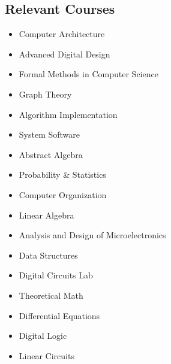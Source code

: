 \documentclass[18pt]{article}
\providecommand{\tightlist}{
    \setlength{\itemsep}{0pt}\setlength{\parskip}{0pt}
}
\begin{document}
\begin{multicols}{2}
    \subsection*{Relevant Courses}\label{relevant-courses}
      \begin{itemize}\tightlist
      \item Computer Architecture
      \item Advanced Digital Design
      \item Formal Methods in Computer Science
      \item Graph Theory
      \item Algorithm Implementation
      \item System Software
      \item Abstract Algebra
      \item Probability \& Statistics
      \item Computer Organization
      \item Linear Algebra
      \item Analysis and Design of Microelectronics
      \item Data Structures
      \item Digital Circuits Lab
      \item Theoretical Math
      \item Differential Equations
      \item Digital Logic
      \item Linear Circuits
      \end{itemize}


  \end{multicols}
\end{document}
